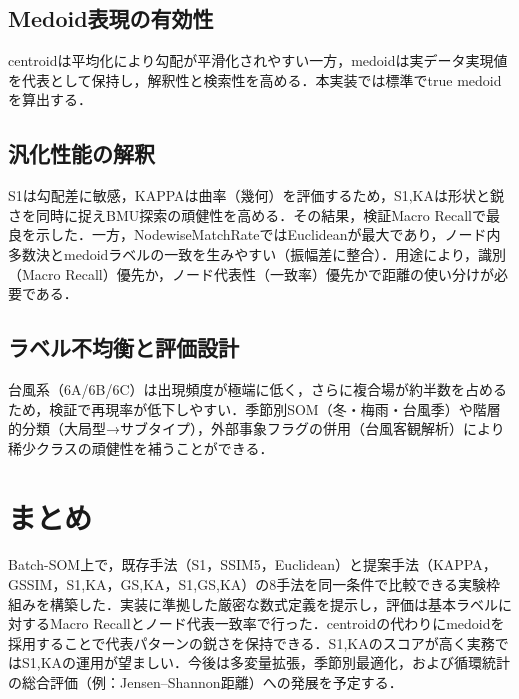 \documentclass{jarticle}
\theoremstyle{definition}
\begin{document}
\subsection{Medoid表現の有効性}
centroidは平均化により勾配が平滑化されやすい一方，medoidは実データ実現値を代表として保持し，解釈性と検索性を高める．本実装では標準でtrue medoidを算出する．

\subsection{汎化性能の解釈}
S1は勾配差に敏感，KAPPAは曲率（幾何）を評価するため，S1,KAは形状と鋭さを同時に捉えBMU探索の頑健性を高める．その結果，検証Macro Recallで最良を示した．一方，NodewiseMatchRateではEuclideanが最大であり，ノード内多数決とmedoidラベルの一致を生みやすい（振幅差に整合）．用途により，識別（Macro Recall）優先か，ノード代表性（一致率）優先かで距離の使い分けが必要である．

\subsection{ラベル不均衡と評価設計}
台風系（6A/6B/6C）は出現頻度が極端に低く，さらに複合場が約半数を占めるため，検証で再現率が低下しやすい．季節別SOM（冬・梅雨・台風季）や階層的分類（大局型→サブタイプ），外部事象フラグの併用（台風客観解析）により稀少クラスの頑健性を補うことができる．

\section{まとめ}
Batch-SOM上で，既存手法（S1，SSIM5，Euclidean）と提案手法（KAPPA，GSSIM，S1,KA，GS,KA，S1,GS,KA）の8手法を同一条件で比較できる実験枠組みを構築した．実装に準拠した厳密な数式定義を提示し，評価は基本ラベルに対するMacro Recallとノード代表一致率で行った．centroidの代わりにmedoidを採用することで代表パターンの鋭さを保持できる．S1,KAのスコアが高く実務ではS1,KAの運用が望ましい．今後は多変量拡張，季節別最適化，および循環統計の総合評価（例：Jensen–Shannon距離）への発展を予定する．
\end{document}
